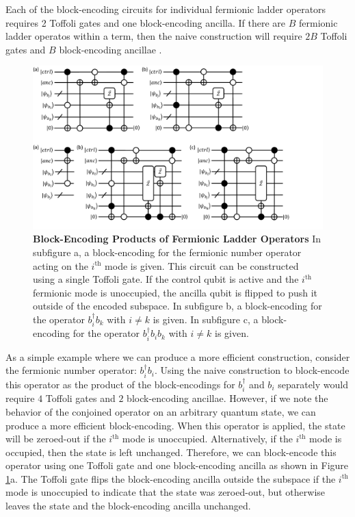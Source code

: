 Each of the block-encoding circuits for individual fermionic ladder operators requires 2 Toffoli gates and one block-encoding ancilla.
If there are $B$ fermionic ladder operatos within a term, then the naive construction will require $2B$ Toffoli gates and $B$ block-encoding ancillae . 

\begin{figure}[h]
    \includegraphics[width=12cm]{figures/fermionic-products-be.pdf}
    \caption{
        \textbf{Block-Encoding Products of Fermionic Ladder Operators}
        In subfigure a, a block-encoding for the fermionic number operator acting on the $i^\text{th}$ mode is given.
        This circuit can be constructed using a single Toffoli gate.
        If the control qubit is active and the $i^\text{th}$ fermionic mode is unoccupied, the ancilla qubit is flipped to push it outside of the encoded subspace.
        In subfigure b, a block-encoding for the operator $b_i^\dagger b_k$ with $i \neq k$ is given.
        In subfigure c, a block-encoding for the operator $b_i^\dagger b_i b_k$ with $i \neq k$ is given.
    }
    \label{fig:fermionic-products-be}
\end{figure}

As a simple example where we can produce a more efficient construction, consider the fermionic number operator: $b_i^\dagger b_i$.
Using the naive construction to block-encode this operator as the product of the block-encodings for $b_i^\dagger$ and $b_i$ separately would require $4$ Toffoli gates and $2$ block-encoding ancillae.
However, if we note the behavior of the conjoined operator on an arbitrary quantum state, we can produce a more efficient block-encoding.
When this operator is applied, the state will be zeroed-out if the $i^\text{th}$ mode is unoccupied.
Alternatively, if the $i^\text{th}$ mode is occupied, then the state is left unchanged.
Therefore, we can block-encode this operator using one Toffoli gate and one block-encoding ancilla as shown in Figure \ref{fig:fermionic-products-be}a.
The Toffoli gate flips the block-encoding ancilla outside the subspace if the $i^\text{th}$ mode is unoccupied to indicate that the state was zeroed-out, but otherwise leaves the state and the block-encoding ancilla unchanged.

